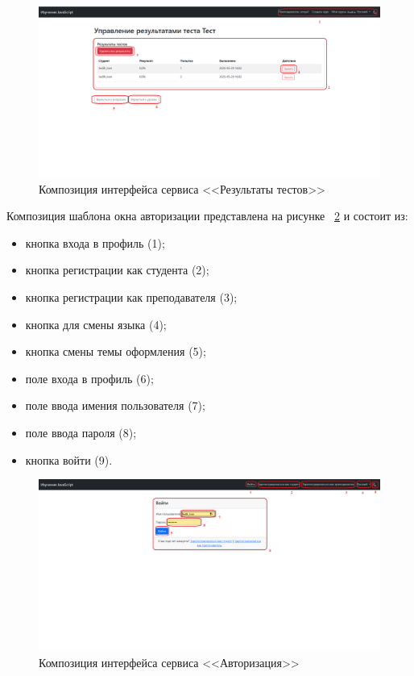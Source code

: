 \begin{figure}[h]
	\centering
	\includegraphics[width=1\linewidth]{images/результаты}
	\caption{Композиция интерфейса сервиса <<Результаты тестов>>}
	\label{templ:image7}
\end{figure}

Композиция шаблона окна авторизации представлена на рисунке ~\ref{templ:image8} и состоит из:

\begin{itemize}
	\item кнопка входа в профиль (1);
	\item кнопка регистрации как студента (2);
	\item кнопка регистрации как преподавателя (3);
	\item кнопка для смены языка (4);
	\item кнопка смены темы оформления (5);
	\item поле входа в профиль (6);
	\item поле ввода имения пользователя (7);
	\item поле ввода пароля (8);
	\item кнопка войти (9).
\end{itemize}

\begin{figure}[h]
	\centering
	\includegraphics[width=1\linewidth]{images/Авторизация}
	\caption{Композиция интерфейса сервиса <<Авторизация>>}
	\label{templ:image8}
\end{figure}

